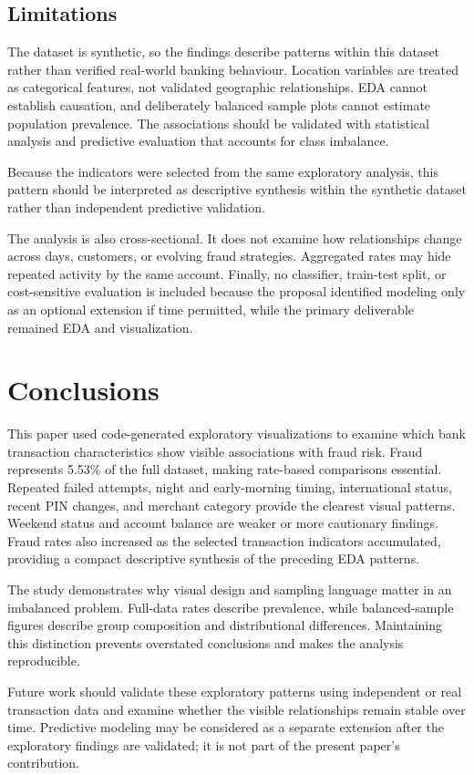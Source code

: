 \documentclass[conference,final,]{IEEEtran}
\begin{document}
\subsection{Limitations}\label{limitations}

The dataset is synthetic, so the findings describe patterns within this
dataset rather than verified real-world banking behaviour. Location
variables are treated as categorical features, not validated geographic
relationships. EDA cannot establish causation, and deliberately balanced
sample plots cannot estimate population prevalence. The associations
should be validated with statistical analysis and predictive evaluation
that accounts for class imbalance.

Because the indicators were selected from the same exploratory analysis,
this pattern should be interpreted as descriptive synthesis within the
synthetic dataset rather than independent predictive validation.

The analysis is also cross-sectional. It does not examine how
relationships change across days, customers, or evolving fraud
strategies. Aggregated rates may hide repeated activity by the same
account. Finally, no classifier, train-test split, or cost-sensitive
evaluation is included because the proposal identified modeling only as
an optional extension if time permitted, while the primary deliverable
remained EDA and visualization.

\section{Conclusions}\label{conclusions}

This paper used code-generated exploratory visualizations to examine
which bank transaction characteristics show visible associations with
fraud risk. Fraud represents 5.53\% of the full dataset, making
rate-based comparisons essential. Repeated failed attempts, night and
early-morning timing, international status, recent PIN changes, and
merchant category provide the clearest visual patterns. Weekend status
and account balance are weaker or more cautionary findings. Fraud rates
also increased as the selected transaction indicators accumulated,
providing a compact descriptive synthesis of the preceding EDA patterns.

The study demonstrates why visual design and sampling language matter in
an imbalanced problem. Full-data rates describe prevalence, while
balanced-sample figures describe group composition and distributional
differences. Maintaining this distinction prevents overstated
conclusions and makes the analysis reproducible.

Future work should validate these exploratory patterns using independent
or real transaction data and examine whether the visible relationships
remain stable over time. Predictive modeling may be considered as a
separate extension after the exploratory findings are validated; it is
not part of the present paper's contribution.

\renewcommand\refname{References}

\end{document}
